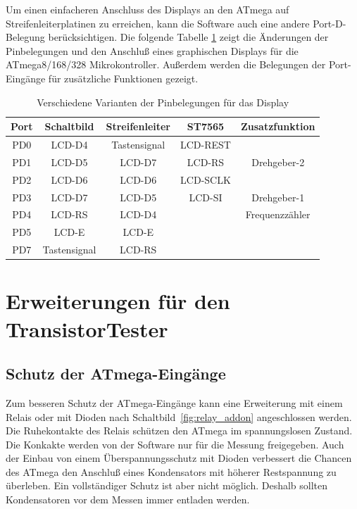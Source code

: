 Um einen einfacheren Anschluss des Displays an den ATmega auf Streifenleiterplatinen zu erreichen,
kann die Software auch eine andere Port-D-Belegung berücksichtigen.
Die folgende Tabelle \ref{tab:grid-change} zeigt die Änderungen der Pinbelegungen und den
Anschluß eines graphischen Displays für die ATmega8/168/328 Mikrokontroller.
Außerdem werden die Belegungen der Port-Eingänge für zusätzliche Funktionen gezeigt. 


\begin{table}[H]
  \begin{center}
    \begin{tabular}{| c || c | c | c | c |}
    \hline
      Port & Schaltbild & Streifenleiter & ST7565    & Zusatzfunktion \\
    \hline
    \hline
    PD0    &  LCD-D4    &  Tastensignal  &  LCD-REST &       \\
    \hline
    PD1    &  LCD-D5    &  LCD-D7        &  LCD-RS   & Drehgeber-2 \\
    \hline
    PD2    &  LCD-D6    &  LCD-D6        &  LCD-SCLK &  \\
    \hline
    PD3    &  LCD-D7    &  LCD-D5        &  LCD-SI   & Drehgeber-1 \\
    \hline
    PD4    &  LCD-RS    &  LCD-D4        &           & Frequenzzähler \\
    \hline
    PD5    &  LCD-E     &  LCD-E         &           &  \\
    \hline
    PD7    &  Tastensignal & LCD-RS      &           &               \\
    \hline
    \end{tabular}
  \end{center}
  \caption{Verschiedene Varianten der Pinbelegungen für das Display }
  \label{tab:grid-change}
\end{table}

\section{Erweiterungen für den TransistorTester}


\subsection{Schutz der ATmega-Eingänge}  

Zum besseren Schutz der ATmega-Eingänge kann eine Erweiterung mit einem Relais oder mit Dioden
nach Schaltbild~\ref{fig:relay_addon} angeschlossen werden.
Die Ruhekontakte des Relais schützen den ATmega im spannungslosen Zustand.
Die Konkakte werden von der Software nur für die Messung freigegeben.
Auch der Einbau von einem Überspannungsschutz mit Dioden verbessert die Chancen des ATmega
den Anschluß eines Kondensators mit höherer Restspannung zu überleben.
Ein vollständiger Schutz ist aber nicht möglich. Deshalb sollten Kondensatoren vor dem Messen immer
entladen werden.


